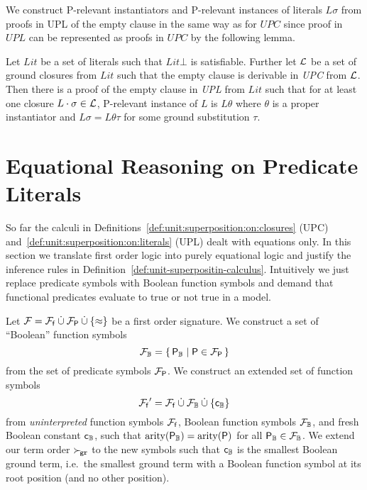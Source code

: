     We construct P-relevant instantiators and P-relevant instances
    of literals \( L\sigma \) from proofs in UPL of the empty clause
    in the same way as for \( UPC \) since proof in \( UPL \) 
    can be represented as
    proofs in \( UPC \) by the following lemma.

    \begin{lemma}\cite{GK2004csl}
        Let \(Lit\) be a set of literals such that \( Lit\bot \) is satisfiable.
        Further let \( \mathcal{L} \) be a set of ground closures from \( Lit \)
        such that the empty clause is derivable in \emph{UPC} from \( \mathcal{L} \).
        Then there is a proof of the empty clause in \emph{UPL} from \( Lit \)
        such that for at least one closure \( L \cdot \sigma \in \mathcal{L} \),
        P-relevant instance of \(L\) is \( L\theta \)
        where \( \theta \) is a proper instantiator
        and \( L\sigma = L\theta\tau \) for some ground substitution \( \tau \).
    \end{lemma}

    \section{Equational Reasoning on Predicate Literals}\label{sec:equational:reasoning:on:predicates}

    So far the calculi in Definitions~\ref{def:unit:superposition:on:closures} (UPC)
    and~\ref{def:unit:superposition:on:literals} (UPL) dealt
    with equations only.
    In this section we translate first order logic
    into purely equational logic and
    justify the inference rules in Definition~\vref{def:unit-superpositin-calculus}.
    Intuitively we just replace predicate symbols with Boolean function symbols
    and demand that functional predicates evaluate to true or not true in a model.

    \begin{definition}
        Let \( \mathcal{F} = {\mathcal{F}_{\mathsf{f}}} \mathbin{\dot\cup} {\mathcal{F}_{\mathsf{P}}} \mathbin{\dot\cup} \{\approx \} \) be a first order signature.
        We construct a set of “Boolean” function symbols
        \[
            {\mathcal{F}}_{\mathbb{B}} = \{ \, {\mathsf{P}}_{\mathbb{B}} \mid \mathsf{P} \in {\mathcal{F}_{\mathsf{P}}} \, \}
        \]
        from the set of predicate symbols \( {\mathcal{F}_{\mathsf{P}}} \).
        We construct an extended set of function symbols
        \[
            {\mathcal{F}_{\mathsf{f}}}' = {\mathcal{F}_{\mathsf{f}}}
            \mathbin{\dot\cup}
            {\mathcal{F}}_{\mathbb{B}}
 \mathbin{\dot\cup}
            \{ {\mathsf{c}}_{\mathbb{B}}
            \}
            \]
        from \emph{uninterpreted} function symbols \( {\mathcal{F}_{\mathsf{f}}} \),
        Boolean function symbols \( {\mathcal{F}}_{\mathbb{B}} \),
        and fresh Boolean constant \( {\mathsf{c}}_{\mathbb{B}} \),
        such that \( \operatorname{arity}({\mathsf{P}}_{\mathbb{B}}) = \operatorname{arity}(\mathsf{P}) \) for all \( {\mathsf{P}}_{\mathbb{B}}\in{\mathcal{F}}_{\mathbb{B}} \).
        We extend our term order \( \mathrel\succ_{\!\mathtt{gr}} \) to the new symbols
        such that \( {\mathsf{c}}_{\mathbb{B}} \) is the smallest Boolean ground term,
        i.e.~the smallest ground term with a Boolean function symbol
        at its root position (and no other position).
    \end{definition}

